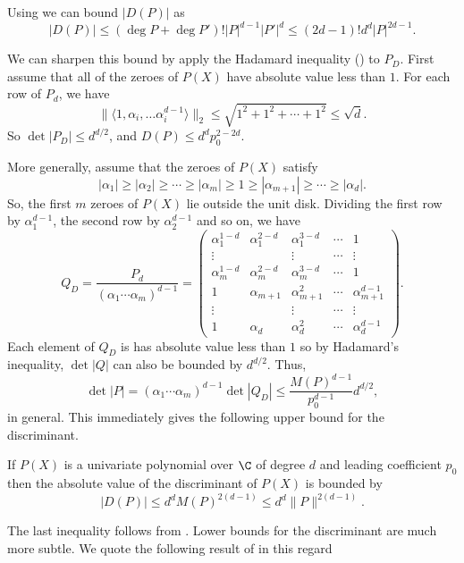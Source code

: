 Using  we can bound $|D(P)|$ as
\begin{equation}\label{PB:DiscrmBound1:Eq}
|D(P)| \le (\deg P + \deg P')! |P|^{d-1} |P'|^d \le (2d-1)! d^d
|P|^{2d-1}.
\end{equation}


We can sharpen this bound by apply the Hadamard inequality
() to $P_D$.  First assume that all of
the zeroes of $P(X)$ have absolute value less than $1$.  For each row
of $P_d$, we have
\[
\|\langle 1, \alpha_i, \ldots \alpha_i^{d-1} \rangle\|_2
\le \sqrt{1^2 + 1^2 + \cdots + 1^2} \le \sqrt{d}.
\]
So $\det|P_D| \le d^{d/2}$, and $D(P) \le d^d p_0^{2-2d}$.

More generally, assume that the zeroes of $P(X)$ satisfy
\[
|\alpha_1| \ge |\alpha_2| \ge \cdots \ge |\alpha_m| \ge 1 \ge |\alpha_{m+1}|
\ge \cdots \ge |\alpha_d|.
\]
So, the first $m$ zeroes of $P(X)$ lie outside the unit disk.
Dividing the first row by $\alpha_1^{d-1}$, the second row by
$\alpha_2^{d-1}$ and so on, we have
\[
Q_D = \frac{P_d}{(\alpha_1 \cdots \alpha_m)^{d-1}} =
\left(\begin{array}{ccccccc}
\alpha_1^{1-d} & \alpha_1^{2-d} & \alpha_1^{3-d} & \cdots & 1 \\
\vdots & & \vdots & \cdots & \vdots \\
\alpha_m^{1-d} & \alpha_m^{2-d} & \alpha_m^{3-d} & \cdots & 1 \\
1 & \alpha_{m+1} & \alpha_{m+1}^2 & \cdots & \alpha_{m+1}^{d-1} \\
\vdots & & \vdots & \cdots & \vdots \\
1 & \alpha_d & \alpha_d^2 & \cdots & \alpha_d^{d-1} 
\end{array}\right).
\]
Each element of $Q_D$ is has absolute value less than $1$ so by
Hadamard's inequality, $\det|Q|$ can also be bounded by $d^{d/2}$.
Thus,
\[
\det|P|= (\alpha_1 \cdots \alpha_m)^{d-1} \det|Q_D| \le 
\frac{M(P)^{d-1}}{p_0^{d-1}} d^{d/2},
\]
in general.  This immediately gives the following upper bound for the
discriminant. 

\begin{proposition}
If $P(X)$ is a univariate polynomial over $\C$ of degree $d$ and
leading coefficient $p_0$ then the absolute value of the discriminant
of $P(X)$ is bounded by
\[
|D(P)| \le d^d M(P)^{2(d-1)} \le d^d \|P\|^{2(d-1)}.
\]
\end{proposition}

The last inequality follows from .  Lower
bounds for the discriminant are much more subtle.  We quote the
following result of {\Odlyzko} in this regard \cite{Odlyzko75,Odlyzko77}

